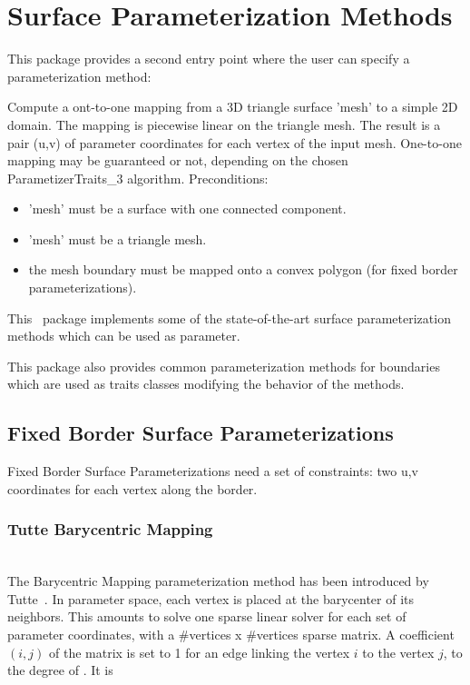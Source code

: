 \section{Surface Parameterization Methods}


This package provides a second  entry point
where the user can specify a parameterization method:

{ Compute a ont-to-one mapping from a 3D triangle surface 'mesh' to a
simple 2D domain. The mapping is piecewise linear on the triangle
mesh. The result is a pair (u,v) of parameter coordinates for each
vertex of the input mesh.  One-to-one mapping may be guaranteed or
not, depending on the chosen ParametizerTraits\_3 algorithm.
Preconditions:\begin{itemize}
\item 'mesh' must be a surface with one connected component.\item
'mesh' must be a triangle mesh.\item the mesh boundary must be mapped onto a convex polygon (for fixed border parameterizations).\end{itemize}
}


This \cgal\ package implements some of the state-of-the-art surface
parameterization methods which can be used as
 parameter.

This package also provides common parameterization methods for
boundaries which are used as traits classes modifying the behavior of
the  methods.


\subsection{Fixed Border Surface Parameterizations}

Fixed Border Surface Parameterizations need a
set of constraints: two u,v coordinates for each vertex along the border.

\subsubsection{Tutte Barycentric Mapping}

  \\

The Barycentric Mapping parameterization method has been introduced by
Tutte~\cite{cgal:fh-survey-05}. In parameter space, each vertex is
placed at the barycenter of its neighbors. This amounts to solve one
sparse linear solver for each set of parameter coordinates, with a
\#vertices x \#vertices sparse matrix. A coefficient $(i,j)$ of the
matrix is set to 1 for an edge linking the vertex $i$ to the vertex
$j$, to the degree of . It is


